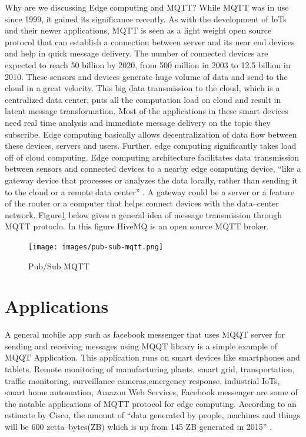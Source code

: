 \documentclass[sigconf]{acmart}
\begin{document}
Why are we discussing Edge computing and MQTT? While MQTT was in use since 1999, it gained its significance recently. As with the development of IoTs and their newer applications, MQTT is seen as a light weight open source protocol that can establish a connection between server and its near end devices and help in quick message delivery. The number of connected devices are expected to reach 50 billion by 2020, from 500 million in 2003 to 12.5 billion in 2010. These sensors and devices generate huge volume of data and send to the cloud in a great velocity. This big data transmission to the cloud, which is a centralized data center, puts all the computation load on cloud and result in latent message transformation. Most of the applications in these smart devices need real time analysis and immediate message delivery on the topic they subscribe. Edge computing basically allows decentralization of data flow between these devices, servers and users. Further, edge computing significantly takes load off of cloud computing. Edge computing architecture facilitates data transmission between sensors and connected devices to a nearby edge computing device, ``like a gateway device that processes or analyzes the data locally, rather than sending it to the cloud or a remote data center'' \cite{www-rtinsights-com}. A gateway could be a server or a feature of the router or a computer that helps connect devices with the data--center network.
Figure\ref{p:Pub/Sub MQTT} below gives a general idea of message transmission through MQTT protoclo. In this figure HiveMQ is an open source MQTT broker. 

\begin{figure}
\texttt{[image: images/pub-sub-mqtt.png]}
\caption{Pub/Sub MQTT}\label{p:Pub/Sub MQTT}
\end{figure}

\section{Applications}
A general mobile app such as facebook messenger that uses MQQT server for sending and receiving messages using MQQT library is a simple example of MQQT Application. This application runs on smart devices like smartphones and tablets.
Remote monitoring of manufacturing plants, smart grid, transportation, traffic monitoring, surveillance cameras,emergency response, industrial IoTs, smart home automation, Amazon Web Services, Facebook messenger are some of the notable  applications of MQTT protocol for edge computing. According to an estimate by Cisco, the amount of ``data generated by people, machines and things will be 600 zetta--bytes(ZB) which is up from 145 ZB generated in 2015'' \cite{www-rtinsights-com}. 
\end{document}
